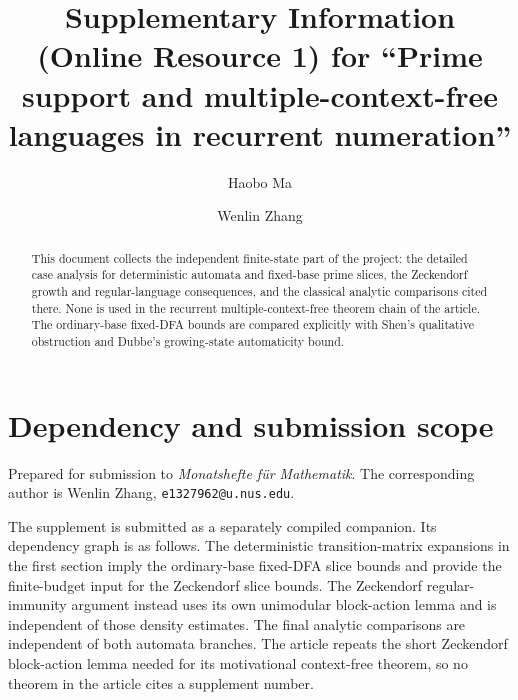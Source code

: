 \documentclass[11pt,a4paper]{amsart}
\title[Supplementary Information]{Supplementary Information (Online Resource 1) for ``Prime support and multiple-context-free languages in recurrent numeration''}
\author{Haobo Ma}
\author{Wenlin Zhang}
\date{}
\begin{document}
\begin{abstract}
This document collects the independent finite-state part of the project:
the detailed case analysis for deterministic automata and fixed-base prime
slices, the Zeckendorf growth and regular-language consequences, and the
classical analytic comparisons cited there. None is used in the recurrent
multiple-context-free theorem chain of the article. The ordinary-base
fixed-DFA bounds are compared explicitly with Shen's qualitative obstruction
and Dubbe's growing-state automaticity bound.
\end{abstract}

\maketitle

\section*{Dependency and submission scope}

Prepared for submission to \emph{Monatshefte f\"ur Mathematik}.
The corresponding author is Wenlin Zhang,
\texttt{e1327962@u.nus.edu}.

The supplement is submitted as a separately compiled companion. Its
dependency graph is as follows. The deterministic transition-matrix
expansions in the first section imply the ordinary-base fixed-DFA slice
bounds and provide the finite-budget input for the Zeckendorf slice bounds.
The Zeckendorf regular-immunity argument instead uses its own unimodular
block-action lemma and is independent of those density estimates. The final
analytic comparisons are independent of both automata branches. The article
repeats the short Zeckendorf block-action lemma needed for its motivational
context-free theorem, so no theorem in the article cites a supplement number.



\appendix



\end{document}
